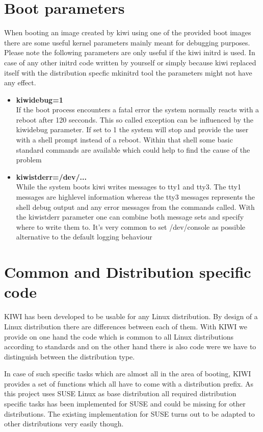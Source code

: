 \section{Boot parameters}
When booting an image created by kiwi using one of the provided
boot images there are some useful kernel parameters mainly meant
for debugging purposes. Please note the following parameters are
only useful if the kiwi initrd is used. In case of any other
initrd code written by yourself or simply because kiwi replaced
itself with the distribution specfic mkinitrd tool the parameters
might not have any effect.

\begin{itemize}
\item \textbf{kiwidebug=1}\\
      If the boot process encounters a fatal error the system normally
      reacts with a reboot after 120 secconds. This so called exception
      can be influenced by the kiwidebug parameter. If set to 1 the system
      will stop and provide the user with a shell prompt instead of a
      reboot. Within that shell some basic standard commands are
      available which could help to find the cause of the problem
\item \textbf{kiwistderr=/dev/...}\\
      While the system boots kiwi writes messages to tty1 and tty3. The
      tty1 messages are highlevel information whereas the tty3 messages
      represents the shell debug output and any error messages from
      the commands called. With the kiwistderr parameter one can combine
      both message sets and specify where to write them to. It's very
      common to set /dev/console as possible alternative to the default
      logging behaviour
\end{itemize}

\section{Common and Distribution specific code}
KIWI has been developed to be usable for any Linux distribution.
By design of a Linux distribution there are differences between
each of them. With KIWI we provide on one hand the code which
is common to all Linux distributions according to standards and
on the other hand there is also code were we have to distinguish
between the distribution type.

In case of such specific tasks which are almost all in the area
of booting, KIWI provides a set of functions which all have to come
with a distribution prefix. As this project uses SUSE Linux as
base distribution all required distribution specific tasks has been
implemented for SUSE and could be missing for other distributions.
The existing implementation for SUSE turns out to be adapted to other
distributions very easily though.

